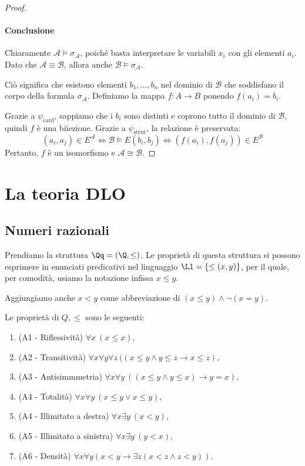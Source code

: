 \documentclass[a4paper,11pt]{report}
\begin{document}
\begin{proof}
\paragraph{Conclusione}
Chiaramente \( \mathcal{A} \models \sigma_{\mathcal{A}} \), poiché basta interpretare le variabili \( x_i \) con gli elementi \( a_i \).
Dato che \( \mathcal{A} \equiv \mathcal{B} \), allora anche \( \mathcal{B} \models \sigma_{\mathcal{A}} \).

Ciò significa che esistono elementi \( b_1, \dots, b_n \) nel dominio di \( \mathcal{B} \) che soddisfano il corpo della formula \( \sigma_{\mathcal{A}} \).
Definiamo la mappa \( f: A \to B \) ponendo \( f(a_i) = b_i \).

Grazie a \( \psi_{\text{card}} \), sappiamo che i \( b_i \) sono distinti e coprono tutto il dominio di \( \mathcal{B} \), quindi \( f \) è una biiezione.
Grazie a \( \psi_{\text{strut}} \), la relazione è preservata:
\[
(a_i, a_j) \in E^{\mathcal{A}} \iff \mathcal{B} \models E(b_i, b_j) \iff (f(a_i), f(a_j)) \in E^{\mathcal{B}}
\]
Pertanto, \( f \) è un isomorfismo e \( \mathcal{A} \cong \mathcal{B} \).
\end{proof}
\pagebreak
\section{La teoria DLO}

\subsection{Numeri razionali}
Prendiamo la struttura \( \Qq = (\Q, \leq ) \). Le proprietà di questa struttura si possono esprimere in enunciati predicativi nel linguaggio \( \Ll = \{\leq (x,y)\}\), per il quale, per comodità, usiamo la notazione infissa \( x \leq y \). 

Aggiungiamo anche \( x < y \) come abbreviazione di \( (x \leq y) \land \neg(x = y)\). 

Le proprietà di \( Q, \leq \) sono le seguenti:

\begin{mdframed}
\begin{enumerate}
    \item (A1 - Riflessività) $\forall x\ (x \leq x),$
    \item (A2 - Transitività) $\forall x\forall y\forall z \ ((x \leq y \land y \leq z \to x \leq z),$
    \item (A3 - Antisimmmetria) $\forall x\forall y\ ((x \leq y \land y \leq x) \to y = x),$
    \item (A4 - Totalità) $\forall x\forall y\ (x \leq y \lor x \leq y),$
    \item (A4 - Illimitato a destra) $\forall x\exists y\ (x < y),$
    \item (A5 - Illimitato a sinistra) $\forall x\exists y\ (y < x),$
    \item (A6 - Densità) $\forall x\forall y(x < y \to \exists z(x < z \land z < y)).$
\end{enumerate}
\end{mdframed}
\end{document}
